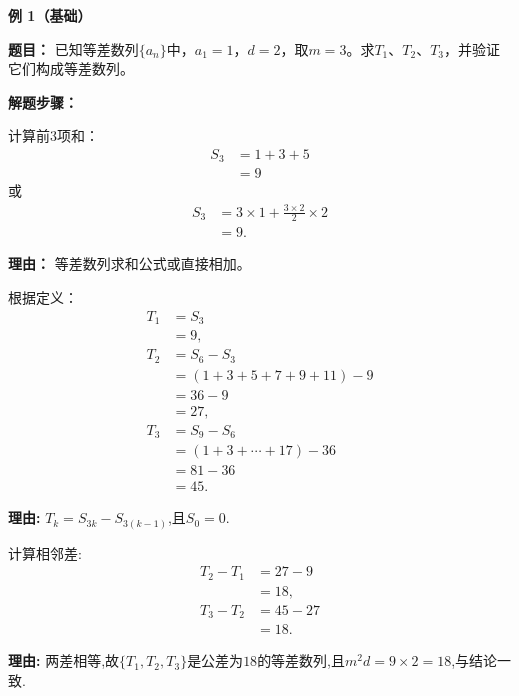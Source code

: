 \begin{examplebox}

	\textbf{\textcolor{CExample}{例 1（基础）}}

	\textbf{\textcolor{CExample}{题目：}}
	已知等差数列$\{a_n\}$中，$a_1=1$，$d=2$，取$m=3$。求$T_1$、$T_2$、$T_3$，并验证它们构成等差数列。

	\textbf{\textcolor{CExample}{解题步骤：}}
	\begin{description}[style=nextline, leftmargin=2.8em, labelsep=0.5em, itemsep=0.45em]
		\item[\textbf{第一步（求$S_3$）：}] 计算前$3$项和：
			\[
				\begin{aligned}
					S_3 &= 1+3+5 \\
					&= 9
			\end{aligned}
			\]
			或
			\[
				\begin{aligned}
					S_3 &= 3\times1 + \frac{3\times2}{2}\times2 \\
					&= 9.
			\end{aligned}
			\]
			\par\textbf{理由：} 等差数列求和公式或直接相加。

		\item[\textbf{第二步（计算$T_1,T_2,T_3$）：}] 根据定义：
			\[
				\begin{aligned}
					T_1 &= S_3 \\
					&= 9, \\[2pt]
					T_2 &= S_6 - S_3 \\
					&= (1+3+5+7+9+11)-9 \\
					&= 36-9 \\
					&= 27, \\[2pt]
					T_3 &= S_9 - S_6 \\
					&= (1+3+\cdots+17)-36 \\
					&= 81-36 \\
					&= 45.
			\end{aligned}
			\]
			\par\textbf{理由:} $T_k = S_{3k} - S_{3(k-1)}$,且$S_0=0$.

		\item[\textbf{第三步(验证等差):}] 计算相邻差:
			\[
				\begin{aligned}
					T_2 - T_1 &= 27 - 9 \\
					&= 18, \\
					T_3 - T_2 &= 45 - 27 \\
					&= 18.
			\end{aligned}
			\]
			\par\textbf{理由:} 两差相等,故$\{T_1,T_2,T_3\}$是公差为$18$的等差数列,且$m^2 d = 9\times2 = 18$,与结论一致.
	\end{description}


\end{examplebox}
